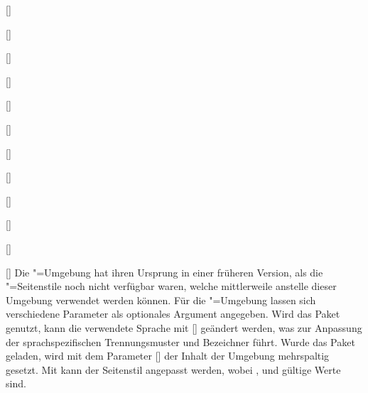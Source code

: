 \begin{Declaration}{[]}
\begin{Declaration}{[]}
\begin{Declaration}{[]}
\begin{Declaration}[v2.02]{[\PSet]}
\begin{Declaration}{[\PSet]}{%
}
\begin{Declaration}[v2.03]{[\PSet]}{%
}
\begin{Declaration}[v2.03]{[\PSet]}{%
}
\begin{Declaration}{[]}{%
}
\begin{Declaration}[v2.03]{%
  []
}{}
\begin{Declaration}[v2.02]{[\PSet]}{%
}
\begin{Declaration}[v2.02]{[\PSet]}{%
}
\begin{Declaration}[v2.02]{[\PSet]}{%
}
\printdeclarationlist%
%
%
%
%
Die "=Umgebung hat ihren Ursprung in einer früheren 
Version, als die "=Seitenstile noch nicht verfügbar 
waren, welche mittlerweile anstelle dieser Umgebung verwendet werden können.
Für die "=Umgebung lassen sich verschiedene Parameter als 
optionales Argument angegeben. Wird das Paket  genutzt, kann die 
verwendete Sprache mit [] 
geändert werden, was zur Anpassung der sprachspezifischen Trennungsmuster und 
Bezeichner führt. Wurde das Paket  geladen, wird mit dem 
Parameter [] der Inhalt der 
Umgebung mehrspaltig gesetzt. Mit  kann 
der Seitenstil angepasst werden, wobei ,  und 
 gültige Werte sind. 


\end{Declaration}
\end{Declaration}
\end{Declaration}
\end{Declaration}
\end{Declaration}
\end{Declaration}
\end{Declaration}
\end{Declaration}
\end{Declaration}
\end{Declaration}
\end{Declaration}
\end{Declaration}
